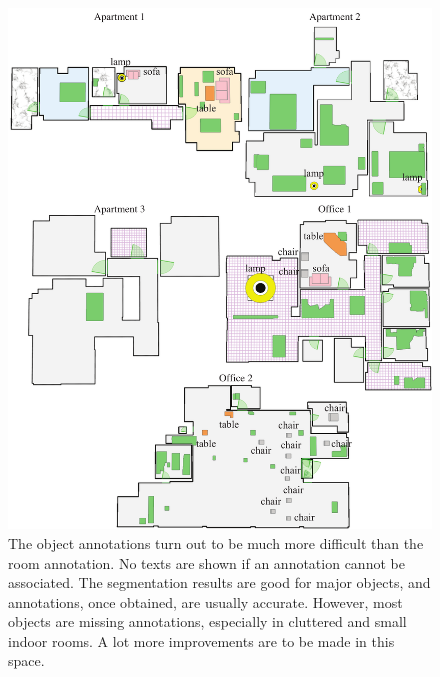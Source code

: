 \clearpage
\begin{figure}[!t]
  \centering
   \includegraphics[width=\textwidth]{../figures/object_annotation.pdf}
  \caption{The object annotations turn out to be much more difficult
  than the room annotation. No texts are shown if an annotation cannot
  be associated. The segmentation results are good for major objects,
  and annotations, once obtained, are usually accurate.  However, most
  objects are missing annotations, especially in cluttered and small
  indoor rooms. A lot more improvements are to be made in this space.  }
  \label{fig:object_recog}
\end{figure}

